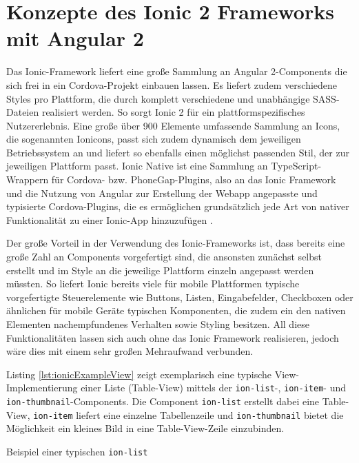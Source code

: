 \section{Konzepte des Ionic 2 Frameworks mit Angular 2}
\label{sec:ionicKonzepte}

Das Ionic-Framework liefert eine große Sammlung an Angular 2-Components die sich frei in ein Cordova-Projekt einbauen lassen. Es liefert zudem verschiedene Styles pro Plattform, die durch komplett verschiedene und unabhängige SASS-Dateien realisiert werden. So sorgt Ionic 2 für ein plattformspezifisches Nutzererlebnis. Eine große über 900 Elemente umfassende Sammlung an Icons, die sogenannten Ionicons, passt sich zudem dynamisch dem jeweiligen Betriebssystem an und liefert so ebenfalls einen möglichst passenden Stil, der zur jeweiligen Plattform passt. Ionic Native ist eine Sammlung an TypeScript-Wrappern für Cordova- bzw. PhoneGap-Plugins, also an das Ionic Framework und die Nutzung von Angular zur Erstellung der Webapp angepasste und typisierte Cordova-Plugins, die es ermöglichen grundsätzlich jede Art von nativer Funktionalität zu einer Ionic-App hinzuzufügen \cite{ionic2Docu}.

Der große Vorteil in der Verwendung des Ionic-Frameworks ist, dass bereits eine große Zahl an Components vorgefertigt sind, die ansonsten zunächst selbst erstellt und im Style an die jeweilige Plattform einzeln angepasst werden müssten. So liefert Ionic bereits viele für mobile Plattformen typische vorgefertigte Steuerelemente wie Buttons, Listen, Eingabefelder, Checkboxen oder ähnlichen für mobile Geräte typischen Komponenten, die zudem ein den nativen Elementen nachempfundenes Verhalten sowie Styling besitzen. All diese Funktionalitäten lassen sich auch ohne das Ionic Framework realisieren, jedoch wäre dies mit einem sehr großen Mehraufwand verbunden. 

Listing \ref{lst:ionicExampleView} zeigt exemplarisch eine typische View-Implementierung einer Liste (Table-View) mittels der \texttt{ion-list}-, \texttt{ion-item}- und \texttt{ion-thumbnail}-Components. Die Component \texttt{ion-list} erstellt dabei eine Table-View, \texttt{ion-item} liefert eine einzelne Tabellenzeile und \texttt{ion-thumbnail} bietet die Möglichkeit ein kleines Bild in eine Table-View-Zeile einzubinden.

\begin{listing}[htb]
    
    \caption{Beispiel einer typischen \texttt{ion-list}}
    \label{lst:ionicExampleView}
\end{listing}

